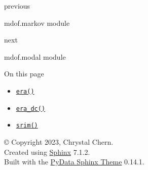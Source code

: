 \href{mdof.markov.html}{\emph{}}

previous

mdof.markov module

\href{mdof.modal.html}{}

next

mdof.modal module

\emph{}

\emph{} On this page

\begin{itemize}
\tightlist
\item
  \protect\hyperlink{mdof.realize.era}{\texttt{era()}}
\item
  \protect\hyperlink{mdof.realize.era_dc}{\texttt{era\_dc()}}
\item
  \protect\hyperlink{mdof.realize.srim}{\texttt{srim()}}
\end{itemize}

© Copyright 2023, Chrystal Chern.\\

Created using \href{https://www.sphinx-doc.org/}{Sphinx} 7.1.2.\\

Built with the
\href{https://pydata-sphinx-theme.readthedocs.io/en/stable/index.html}{PyData
Sphinx Theme} 0.14.1.
